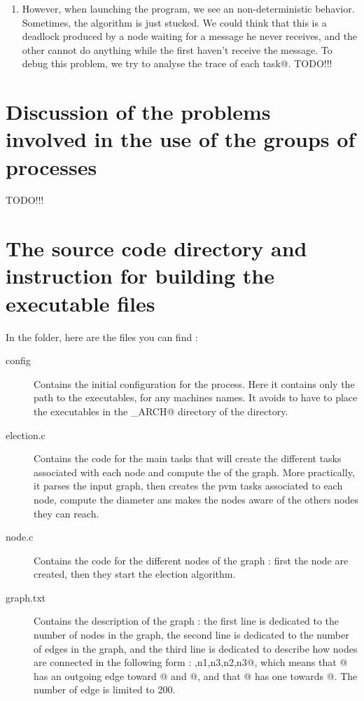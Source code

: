\documentclass{article}
\begin{document}
\begin{enumerate}
\item However, when launching the program, we see an non-deterministic behavior. Sometimes, the algorithm is just stucked. We could think that this is a deadlock produced by a node waiting for a message he never receives, and the other cannot do anything while the first haven't receive the message. To debug this problem, we try to analyse the trace of each \verb@pvm task@. \huge{TODO!!!}
\end{enumerate}

\section{Discussion of the problems involved in the use of the groups of processes}
 \huge{TODO!!!}\normalsize

\section{The source code directory and instruction for building the executable files}
In the \verb@code@ folder, here are the files you can find : 
\begin{description}
\item[config] Contains the initial configuration for the \verb@pvm@ process. Here it contains only the path to the executables, for any machines names. It avoids to have to place the executables in the \verb@PVM_ARCH@ directory of the \verb@pvm@ directory.
\item[election.c] Contains the code for the main tasks that will create the different \verb@pvm@ tasks associated with each node and compute the \verb@diameter@ of the graph. More practically, it parses the input graph, then creates the pvm tasks associated to each node, compute the diameter ans makes the nodes aware of the others nodes they can reach.
\item[node.c] Contains the code for the different nodes of the graph : first the node are created, then they start the election algorithm.
\item[graph.txt] Contains the description of the graph : the first line is dedicated to the number of nodes in the graph, the second line is dedicated to the number of edges in the graph, and the third line is dedicated to describe how nodes are connected in the following form : ,{n1,n3},{n2,n3}@, which means that @ has an outgoing edge toward @ and @, and that @ has one towards @. The number of edge is limited to 200.
\end{description}
\end{document}
